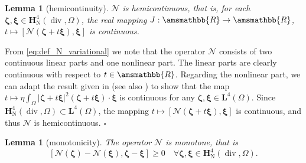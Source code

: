 \documentclass[fleqn,a4paper]{cas-sc}
\newcommand\vdiv{\mathop{\mathrm{div}}\nolimits}
\newcommand{\bbR}{\amsmathbb{R}}
\newcommand{\bxi}{\boldsymbol{\xi}}
\newcommand{\bzeta}{\boldsymbol{\zeta}}
\newcommand{\0}{\boldsymbol{0}}
\newcommand\cN{\mathcal{N}}
\newcommand\bH{\mathbf{H}}
\newcommand\bL{\mathbf{L}}
\numberwithin{equation}{section}
\numberwithin{figure}{section}
\newtheorem{lemma}[theorem]{Lemma}
\newenvironment{proof}{\noindent{\it Proof.}}{\hfill$\square$}
\begin{document}
\begin{lemma}[hemicontinuity]\label{lem:hemicontinuity} $\cN$ is hemicontinuous, that is, for each $ \bzeta, \bxi \in \bH^4_{\mathrm{N}}(\vdiv,\Omega)$, the real mapping $J:\bbR \to \bbR $, $t \mapsto [\cN(\bzeta + t\bxi), \bxi]$ is continuous.
\end{lemma}
\begin{proof}
    From \eqref{eq:def_N_variational} we note that the operator $\cN$ consists of two continuous linear parts and one nonlinear part. The linear parts are clearly continuous with respect to $t \in \bbR$. Regarding the nonlinear part,  we can adapt the result given in \cite[Proposition 3]{Girault2008} (see also \cite[Lemma 3.2]{Caucao2020}) to show that the map $t \mapsto \displaystyle \eta \int_\Omega |\bzeta + t\bxi|^2 (\bzeta + t\bxi) \cdot \bxi$ is continuous for any $\bzeta, \bxi \in \bL^4(\Omega)$. Since $ \bH^4_{\mathrm{N}}(\vdiv,\Omega) \subset \bL^4(\Omega)$, the mapping $t \mapsto [\cN(\bzeta + t\bxi), \bxi]$ is continuous, and thus $\cN$ is hemicontinuous.
\end{proof}
\begin{lemma}[monotonicity]\label{lem:monotonicity}
   The operator $\mathcal{N}$ is monotone, that is
\[[\cN(\bzeta) - \cN(\bxi), \bzeta - \bxi] \ge 0 \quad \forall \bzeta, \bxi \in \bH^4_{\mathrm{N}}(\vdiv,\Omega).\]
\end{lemma}
\end{document}
